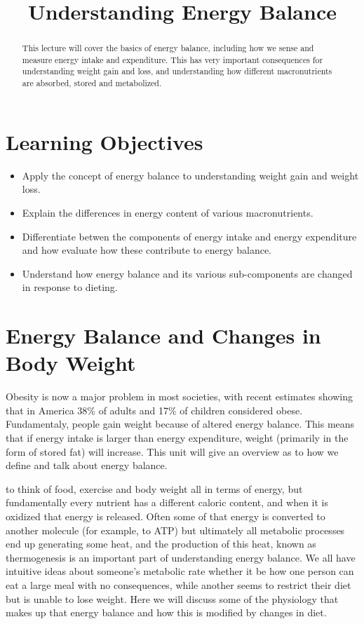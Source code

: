 \documentclass{tufte-handout}
\title{Understanding Energy Balance}
\author{}
\date{}  %
\begin{document}
\maketitle%

\begin{abstract}
\noindent This lecture will cover the basics of energy balance, including how we sense and measure energy intake and expenditure.  This has very important consequences for understanding weight gain and loss, and understanding how different macronutrients are absorbed, stored and metabolized.
\end{abstract}

\tableofcontents

\pagebreak
\section{Learning Objectives}

\begin{itemize}
\item Apply the concept of energy balance to understanding weight gain and weight loss.
\item Explain the differences in energy content of various macronutrients.
\item Differentiate betwen the components of energy intake and energy expenditure and how evaluate how these contribute to energy balance.
\item Understand how energy balance and its various sub-components are changed in response to dieting.

\end{itemize}


\section{Energy Balance and Changes in Body Weight}

Obesity is now a major problem in most societies, with recent estimates showing that in America 38\% of adults and 17\% of children considered obese\citep{Flegal2016,Ogden2016}.  Fundamentaly, people gain weight because of altered energy balance.  This means that if energy intake is larger than energy expenditure, weight (primarily in the form of stored fat) will increase.  This unit will give an overview as to how we define and talk about energy balance.

 to think of food, exercise and body weight all in terms of energy, but fundamentally every nutrient has a different caloric content, and when it is oxidized that energy is released.  Often some of that energy is converted to another molecule (for example, to ATP) but ultimately all metabolic processes end up generating some heat, and the production of this heat, known as thermogenesis is an important part of understanding energy balance.  We all have intuitive ideas about someone's metabolic rate whether it be how one person can eat a large meal with no consequences, while another seems to restrict their diet but is unable to lose weight.  Here we will discuss some of the physiology that makes up that energy balance and how this is modified by changes in diet.
\end{document}
